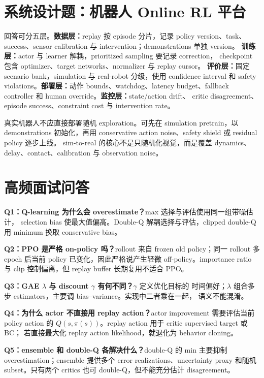 \documentclass[10pt,twocolumn,a4paper]{ctexart}
\begin{document}
\section{系统设计题：机器人 Online RL 平台}
回答可分五层。\textbf{数据层：}replay 按 episode 分片，记录 policy version、task、
success、sensor calibration 与 intervention；demonstrations 单独 version。
\textbf{训练层：}actor 与 learner 解耦，prioritized sampling 要记录 correction，
checkpoint 包含 optimizer、target networks、normalizer 与 replay cursor。
\textbf{评价层：}固定 scenario bank，simulation 与 real-robot 分级，使用 confidence
interval 和 safety violations。\textbf{部署层：}动作 bounds、watchdog、latency
budget、fallback controller 和 human override。\textbf{监控层：}state/action drift、
critic disagreement、episode success、constraint cost 与 intervention rate。

真实机器人不应直接部署随机 exploration。可先在 simulation pretrain，以 demonstrations
初始化，再用 conservative action noise、safety shield 或 residual policy 逐步上线。
sim-to-real 的核心不是只随机化视觉，而是覆盖 dynamics、delay、contact、calibration 与
observation noise。

\section{高频面试问答}
\textbf{Q1：Q-learning 为什么会 overestimate？}max 选择与评估使用同一组带噪估计，
selection bias 使最大值偏高。Double-Q 解耦选择与评估，clipped double-Q 用 minimum
换取 conservative bias。

\textbf{Q2：PPO 是严格 on-policy 吗？}rollout 来自 frozen old policy；同一 rollout
多 epoch 后当前 policy 已变化，因此严格说产生轻微 off-policy。importance ratio 与
clip 控制偏离，但 replay buffer 长期复用不适合 PPO。

\textbf{Q3：GAE $\lambda$ 与 discount $\gamma$ 有何不同？}$\gamma$ 定义优化目标的
时间偏好；$\lambda$ 组合多步 estimators，主要调 bias--variance。实现中二者乘在一起，
语义不能混淆。

\textbf{Q4：为什么 actor 不直接用 replay action？}actor improvement 需要评估当前
policy action 的 $Q(s,\pi(s))$。replay action 用于 critic supervised target 或 BC；
若直接最大化 replay action likelihood，就退化为 behavior cloning。

\textbf{Q5：ensemble 和 double-Q 各解决什么？}double-Q 的 min 主要抑制
overestimation；ensemble 提供多个 error realizations、uncertainty proxy 和随机
subset。只有两个 critics 也可 double-Q，但不能充分估计 disagreement。
\end{document}
